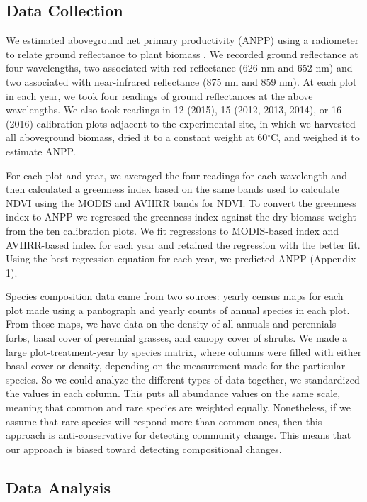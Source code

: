 \documentclass[fleqn,10pt,lineno]{wlpeerj} %
\begin{document}
\subsection{Data Collection}\label{data-collection}

We estimated aboveground net primary productivity (ANPP) using a
radiometer to relate ground reflectance to plant biomass \citep[see][
for a review]{Byrne2011}. We recorded ground reflectance at four
wavelengths, two associated with red reflectance (626 nm and 652 nm) and
two associated with near-infrared reflectance (875 nm and 859 nm). At
each plot in each year, we took four readings of ground reflectances at
the above wavelengths. We also took readings in 12 (2015), 15 (2012,
2013, 2014), or 16 (2016) calibration plots adjacent to the experimental
site, in which we harvested all aboveground biomass, dried it to a
constant weight at 60\(^{\circ}\)C, and weighed it to estimate ANPP.

For each plot and year, we averaged the four readings for each
wavelength and then calculated a greenness index based on the same bands
used to calculate NDVI using the MODIS and AVHRR bands for NDVI. To
convert the greenness index to ANPP we regressed the greenness index
against the dry biomass weight from the ten calibration plots. We fit
regressions to MODIS-based index and AVHRR-based index for each year and
retained the regression with the better fit. Using the best regression
equation for each year, we predicted ANPP (Appendix 1).

Species composition data came from two sources: yearly census maps for
each plot made using a pantograph \citep{Hill1920} and yearly counts of
annual species in each plot. From those maps, we have data on the
density of all annuals and perennials forbs, basal cover of perennial
grasses, and canopy cover of shrubs. We made a large plot-treatment-year
by species matrix, where columns were filled with either basal cover or
density, depending on the measurement made for the particular species.
So we could analyze the different types of data together, we
standardized the values in each column. This puts all abundance values
on the same scale, meaning that common and rare species are weighted
equally. Nonetheless, if we assume that rare species will respond more
than common ones, then this approach is anti-conservative for detecting
community change. This means that our approach is biased toward
detecting compositional changes.

\subsection{Data Analysis}\label{data-analysis}
\end{document}
